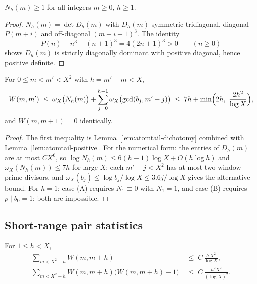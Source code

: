 \begin{lemma}\label{lem:atomtail-positive}
$N_h(m)\ge1$ for all integers $m\ge0$, $h\ge1$.
\end{lemma}

\begin{proof}
$N_h(m)=\det D_h(m)$ with $D_h(m)$ symmetric tridiagonal,
diagonal $P(m+i)$ and off-diagonal $(m+i+1)^3$.
The identity
\[
  P(n)-n^3-(n+1)^3=4(2n+1)^3>0\qquad(n\ge0)
\]
shows $D_h(m)$ is strictly diagonally dominant with positive
diagonal, hence positive definite.
\end{proof}

\begin{theorem}
\label{thm:atomtail-twin}
For $0\le m<m'<X^2$ with $h=m'-m<X$,
\[
 W(m,m')\;\le\;\omega_X\bigl(N_h(m)\bigr)
 +\sum_{j=0}^{h-1}\omega_X\bigl(\gcd(b_j,m'-j)\bigr)
 \;\le\;7h+\min\Bigl(2h,\ \frac{2h^2}{\log X}\Bigr),
\]
and $W(m,m+1)=0$ identically.
\end{theorem}

\begin{proof}
The first inequality is Lemma~\ref{lem:atomtail-dichotomy}
combined with Lemma~\ref{lem:atomtail-positive}.  For the
numerical form: the entries of $D_h(m)$ are at most $C X^6$, so
$\log N_h(m)\le 6(h-1)\log X+O(h\log h)$ and
$\omega_X(N_h(m))\le7h$ for large $X$; each $m'-j<X^2$ has at
most two window prime divisors, and
$\omega_X(b_j)\le\log b_j/\log X\le 3.6j/\log X$ gives the
alternative bound.  For $h=1$: case (A) requires
$N_1\equiv0$ with $N_1=1$, and case (B) requires $p\mid b_0=1$;
both are impossible.
\end{proof}

\subsection{Short-range pair statistics}

\begin{proposition}
\label{prop:atomtail-shortrange}
For $1\le h<X$,
\begin{align}
 \sum_{m<X^2-h}W(m,m+h)
 &\;\le\;C\,\frac{h\,X^2}{\log X},
 \label{eq:atomtail-t1-first}\\
 \sum_{m<X^2-h}W(m,m+h)\bigl(W(m,m+h)-1\bigr)
 &\;\le\;C\,\frac{h^2X^2}{(\log X)^2}.
 \label{eq:atomtail-t1-energy}
\end{align}
\end{proposition}

